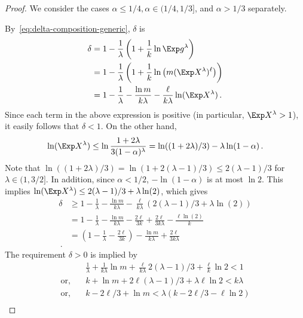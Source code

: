 \begin{proof}
We consider the cases $\alpha \leq 1/4, \alpha \in (1/4, 1/3]$, and $\alpha > 1/3$ separately.

By~\eqref{eq:delta-composition-generic}, $\delta$ is 
\begin{align*}
    \delta
    &= 1 - \frac{1}{\lambda}\left(1 + \frac{1}{k} \ln \Exp g^\lambda \right) \\
    &= 1 - \frac{1}{\lambda}\left(1 + \frac{1}{k} \ln \left( m (\Exp X^\lambda)^\ell\right) \right) \\
    &= 1 - \frac{1}{\lambda} - \frac{\ln m}{k \lambda} - \frac{\ell}{k \lambda} \ln (\Exp X^\lambda)
    \,.
\end{align*}
Since each term in the above expression is positive (in particular, $\Exp X^\lambda > 1$), 
it easily follows that $\delta < 1$. 
On the other hand, 
\[
    \ln (\Exp X^\lambda) \leq \ln \frac{1+2\lambda}{3(1-\alpha)^\lambda} = \ln ((1+2\lambda)/3) - \lambda \ln(1-\alpha)
    \,.
\]
Note that $\ln((1+2 \lambda)/3) = \ln(1+ 2(\lambda-1)/3) \leq 2(\lambda - 1)/3$ for $\lambda \in (1, 3/2]$. 
In addition, since $\alpha < 1/2$, $-\ln(1-\alpha)$ is at most $\ln 2$. 
This implies 
$
    \ln (\Exp X^\lambda) \leq 2(\lambda-1)/3 + \lambda \ln(2)
$, which gives
\begin{align*}
    \delta 
    &\geq 
        1 
        - \frac{1}{\lambda} 
        - \frac{\ln m}{k \lambda} 
        - \frac{\ell}{k \lambda} \left( 2(\lambda-1)/3 + \lambda \ln(2) \right) \\
   &=   1 
        - \frac{1}{\lambda} 
        - \frac{\ln m}{k \lambda} 
        - \frac{2\ell}{3k} +\frac{2\ell}{3 k\lambda} - \frac{\ell \ln(2)}{k} \\
   &=   \left(1 
        - \frac{1}{\lambda} 
        - \frac{2\ell}{3k} \right)
        - \frac{\ln m}{k \lambda} 
        +\frac{2\ell}{3 k\lambda} 
        \\
        \, .
\end{align*}
The requirement $\delta > 0$ is implied by
\begin{align*}
    &\frac{1}{\lambda} + 
    \frac{1}{k\lambda} \ln m + 
    \frac{\ell}{k\lambda} 2(\lambda - 1)/3 + 
    \frac{\ell}{k} \ln2 
    < 1 \\
    \text{or},\quad& k + \ln m + 2\ell(\lambda - 1)/3 + \lambda \ell \ln 2 < k\lambda \\
    \text{or},\quad& k - 2\ell/3 + \ln m < \lambda( k -2\ell/3 - \ell \ln 2) \\

\end{align*}
\end{proof}
